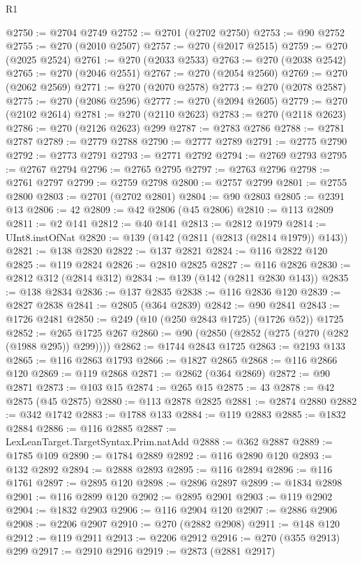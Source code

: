 \begin{lexlean}{R1}
\begin{coremodule}
@2750 := @2704 @2749
@2752 := @2701 (@2702 @2750)
@2753 := @90 @2752
@2755 := @270 (@2010 @2507)
@2757 := @270 (@2017 @2515)
@2759 := @270 (@2025 @2524)
@2761 := @270 (@2033 @2533)
@2763 := @270 (@2038 @2542)
@2765 := @270 (@2046 @2551)
@2767 := @270 (@2054 @2560)
@2769 := @270 (@2062 @2569)
@2771 := @270 (@2070 @2578)
@2773 := @270 (@2078 @2587)
@2775 := @270 (@2086 @2596)
@2777 := @270 (@2094 @2605)
@2779 := @270 (@2102 @2614)
@2781 := @270 (@2110 @2623)
@2783 := @270 (@2118 @2623)
@2786 := @270 (@2126 @2623) @299
@2787 := @2783 @2786
@2788 := @2781 @2787
@2789 := @2779 @2788
@2790 := @2777 @2789
@2791 := @2775 @2790
@2792 := @2773 @2791
@2793 := @2771 @2792
@2794 := @2769 @2793
@2795 := @2767 @2794
@2796 := @2765 @2795
@2797 := @2763 @2796
@2798 := @2761 @2797
@2799 := @2759 @2798
@2800 := @2757 @2799
@2801 := @2755 @2800
@2803 := @2701 (@2702 @2801)
@2804 := @90 @2803
@2805 := @2391 @13
@2806 := 42
@2809 := @42 @2806 (@45 @2806)
@2810 := @113 @2809
@2811 := @2 @141
@2812 := @40 @141
@2813 := @2812 @1979
@2814 := UInt8.instOfNat
@2820 := @139 (@142 (@2811 (@2813 (@2814 @1979)) @143))
@2821 := @138 @2820
@2822 := @137 @2821
@2824 := @116 @2822 @120
@2825 := @119 @2824
@2826 := @2810 @2825
@2827 := @116 @2826
@2830 := @2812 @312 (@2814 @312)
@2834 := @139 (@142 (@2811 @2830 @143))
@2835 := @138 @2834
@2836 := @137 @2835
@2838 := @116 @2836 @120
@2839 := @2827 @2838
@2841 := @2805 (@364 @2839)
@2842 := @90 @2841
@2843 := @1726 @2481
@2850 := @249 (@10 (@250 @2843 @1725) (@1726 @52)) @1725
@2852 := @265 @1725 @267
@2860 := @90 (@2850 (@2852 (@275 (@270 (@282 (@1988 @295)) @299))))
@2862 := @1744 @2843 @1725
@2863 := @2193 @133
@2865 := @116 @2863 @1793
@2866 := @1827 @2865
@2868 := @116 @2866 @120
@2869 := @119 @2868
@2871 := @2862 (@364 @2869)
@2872 := @90 @2871
@2873 := @103 @15
@2874 := @265 @15
@2875 := 43
@2878 := @42 @2875 (@45 @2875)
@2880 := @113 @2878 @2825
@2881 := @2874 @2880
@2882 := @342 @1742
@2883 := @1788 @133
@2884 := @119 @2883
@2885 := @1832 @2884
@2886 := @116 @2885
@2887 := LexLeanTarget.TargetSyntax.Prim.natAdd
@2888 := @362 @2887
@2889 := @1785 @109
@2890 := @1784 @2889
@2892 := @116 @2890 @120
@2893 := @132 @2892
@2894 := @2888 @2893
@2895 := @116 @2894
@2896 := @116 @1761
@2897 := @2895 @120
@2898 := @2896 @2897
@2899 := @1834 @2898
@2901 := @116 @2899 @120
@2902 := @2895 @2901
@2903 := @119 @2902
@2904 := @1832 @2903
@2906 := @116 @2904 @120
@2907 := @2886 @2906
@2908 := @2206 @2907
@2910 := @270 (@2882 @2908)
@2911 := @148 @120
@2912 := @119 @2911
@2913 := @2206 @2912
@2916 := @270 (@355 @2913) @299
@2917 := @2910 @2916
@2919 := @2873 (@2881 @2917)

\end{coremodule}
\end{lexlean}

